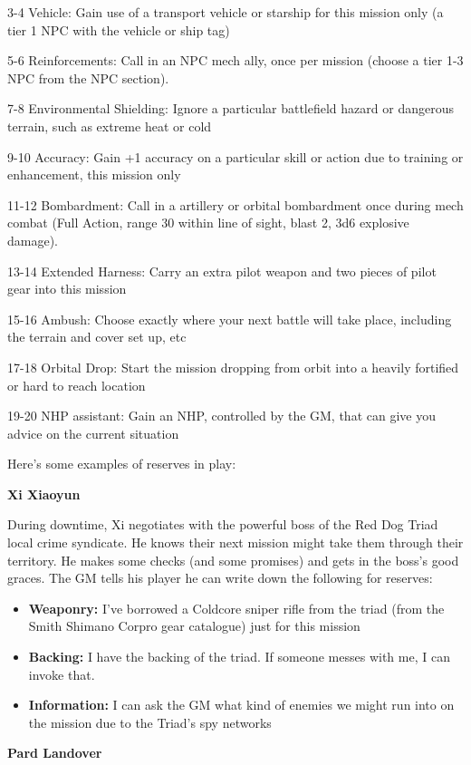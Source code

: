 3-4     Vehicle: Gain use of a transport vehicle or starship for this mission only (a tier 1 NPC with the vehicle or ship tag)

5-6     Reinforcements: Call in an NPC mech ally, once per mission (choose a tier 1-3 NPC from the NPC section).

7-8     Environmental Shielding: Ignore a particular battlefield hazard or dangerous terrain, such as extreme heat or cold

9-10    Accuracy: Gain +1 accuracy on a particular skill or action due to training or enhancement, this mission only

11-12   Bombardment: Call in a artillery or orbital bombardment once during mech combat (Full Action, range 30 within line of sight, blast 2, 3d6 explosive damage).

13-14   Extended Harness: Carry an extra pilot weapon and two pieces of pilot gear into this mission

15-16   Ambush: Choose exactly where your next battle will take place, including the terrain and cover set up, etc

17-18   Orbital Drop: Start the mission dropping from orbit into a heavily fortified or hard to reach location

19-20   NHP assistant: Gain an NHP, controlled by the GM, that can give you advice on the current situation

Here's some examples of reserves in play:

\textbf{Xi Xiaoyun}

During downtime, Xi negotiates with the powerful boss of the Red Dog Triad local crime syndicate. He knows their next mission might take them through their territory. He makes some checks (and some promises) and gets in the boss's good graces. The GM tells his player he can write down the following for reserves:
\begin{itemize}
\item \textbf{Weaponry:} I've borrowed a Coldcore sniper rifle from the triad (from the Smith Shimano Corpro gear catalogue) just for this mission
\item \textbf{Backing:} I have the backing of the triad. If someone messes with me, I can invoke that.
\item \textbf{Information:} I can ask the GM what kind of enemies we might run into on the mission due to the Triad's spy networks
\end{itemize}  

\textbf{Pard Landover}


